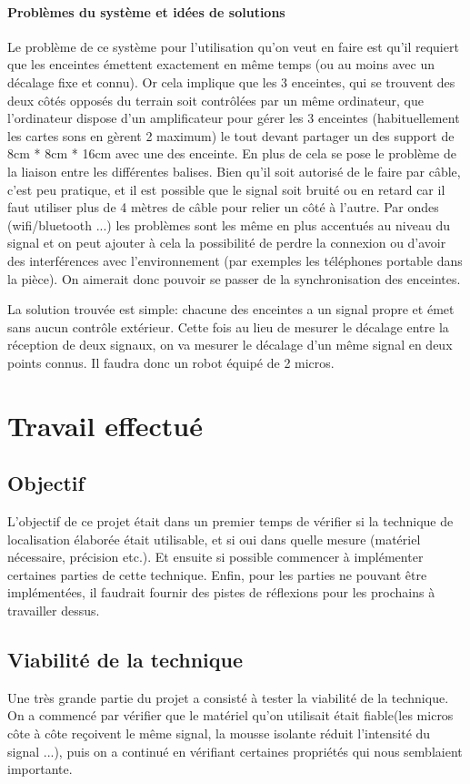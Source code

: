 \documentclass[12pt,a4paper]{report}
\begin{document}
\subsection{Problèmes du système et idées de solutions}
Le problème de ce système pour l'utilisation qu'on veut en faire est qu'il requiert que les enceintes émettent exactement en même temps (ou au moins avec un décalage fixe et connu). Or cela implique que les 3 enceintes, qui se trouvent des deux côtés opposés du terrain soit contrôlées par un même ordinateur, que l'ordinateur dispose d'un amplificateur pour gérer les 3 enceintes (habituellement les cartes sons en gèrent 2 maximum) le tout devant partager un des support de 8cm * 8cm * 16cm avec une des enceinte. En plus de cela se pose le problème de la liaison entre les différentes balises. Bien qu'il soit autorisé de le faire par câble, c'est peu pratique, et il est possible que le signal soit bruité ou en retard car il faut utiliser plus de 4 mètres de câble pour relier un côté à l'autre. Par ondes (wifi/bluetooth ...) les problèmes sont les même en plus accentués au niveau du signal et on peut ajouter à cela la possibilité de perdre la connexion ou d'avoir des interférences avec l'environnement (par exemples les téléphones portable dans la pièce).
On aimerait donc pouvoir se passer de la synchronisation des enceintes.

La solution trouvée est simple: chacune des enceintes a un signal propre et émet sans aucun contrôle extérieur. Cette fois au lieu de mesurer le décalage entre la réception de deux signaux, on va mesurer le décalage d'un même signal en deux points connus. Il faudra donc un robot équipé de 2 micros. 


\part{Travail effectué}
\chapter{Objectif}

L'objectif de ce projet était dans un premier temps de vérifier si la technique de localisation élaborée était utilisable, et si oui dans quelle mesure (matériel nécessaire, précision etc.). Et ensuite si possible commencer à implémenter certaines parties de cette technique. Enfin, pour les parties ne pouvant être implémentées, il faudrait fournir des pistes de réflexions pour les prochains à travailler dessus.

\chapter{Viabilité de la technique}
Une très grande partie du projet a consisté à tester la viabilité de la technique. On a commencé par vérifier que le matériel qu'on utilisait était fiable(les micros côte à côte reçoivent le même signal, la mousse isolante réduit l'intensité du signal ...), puis on a continué en vérifiant certaines propriétés qui nous semblaient importante.\\
\end{document}
